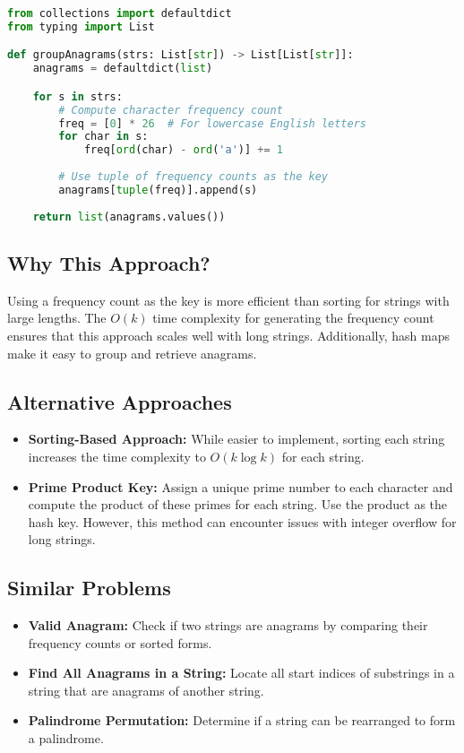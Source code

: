 \begin{fullwidth}
\begin{lstlisting}[language=Python]
from collections import defaultdict
from typing import List

def groupAnagrams(strs: List[str]) -> List[List[str]]:
    anagrams = defaultdict(list)

    for s in strs:
        # Compute character frequency count
        freq = [0] * 26  # For lowercase English letters
        for char in s:
            freq[ord(char) - ord('a')] += 1
        
        # Use tuple of frequency counts as the key
        anagrams[tuple(freq)].append(s)
    
    return list(anagrams.values())
\end{lstlisting}
\end{fullwidth}

\subsection*{Why This Approach?}
Using a frequency count as the key is more efficient than sorting for strings with large lengths. The \(O(k)\) time complexity for generating the frequency count ensures that this approach scales well with long strings. Additionally, hash maps make it easy to group and retrieve anagrams.

\subsection*{Alternative Approaches}
\begin{itemize}
    \item \textbf{Sorting-Based Approach:}  
    While easier to implement, sorting each string increases the time complexity to \(O(k \log k)\) for each string.
    \item \textbf{Prime Product Key:}  
    Assign a unique prime number to each character and compute the product of these primes for each string. Use the product as the hash key. However, this method can encounter issues with integer overflow for long strings.
\end{itemize}

\subsection*{Similar Problems}
\begin{itemize}
    \item \textbf{Valid Anagram:} Check if two strings are anagrams by comparing their frequency counts or sorted forms.
    \item \textbf{Find All Anagrams in a String:} Locate all start indices of substrings in a string that are anagrams of another string.
    \item \textbf{Palindrome Permutation:} Determine if a string can be rearranged to form a palindrome.
\end{itemize}

